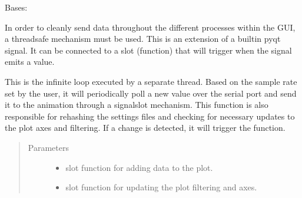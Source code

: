 \documentclass[letterpaper,10pt,english]{sphinxmanual}
\begin{document}
\begin{fulllineitems}
\label{\detokenize{plotGUI:plotGUI.Communicate}}
Bases: 

In order to cleanly send data throughout the different processes within the GUI,
a thread\sphinxhyphen{}safe mechanism must be used. This is an extension of a built\sphinxhyphen{}in pyqt signal.
It can be connected to a slot (function) that will trigger when the signal emits a value.

\begin{fulllineitems}
\label{\detokenize{plotGUI:plotGUI.Communicate.data_signal}}
\end{fulllineitems}


\end{fulllineitems}


\begin{fulllineitems}
\label{\detokenize{plotGUI:plotGUI.dataSendLoop}}
This is the infinite loop executed by a separate thread. Based on the sample rate set by the user,
it will periodically poll a new value over the serial port and send it to the animation through a
signal\sphinxhyphen{}slot mechanism. This function is also responsible for re\sphinxhyphen{}hashing the settings files and
checking for necessary updates to the plot axes and filtering. If a change is detected, it will
trigger the  function.
\begin{quote}\begin{description}
\item[{Parameters}] \leavevmode\begin{itemize}
\item {} 
 \textendash{} slot function for adding data to the plot.

\item {} 
 \textendash{} slot function for updating the plot filtering and axes.

\end{itemize}

\end{description}\end{quote}

\end{fulllineitems}
\end{document}

